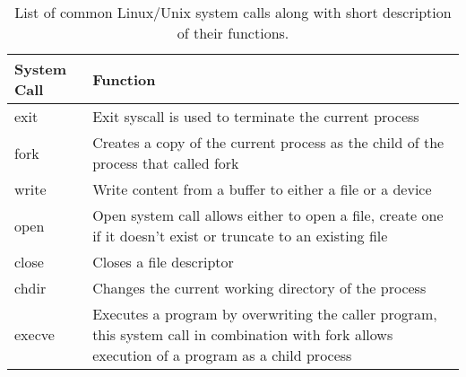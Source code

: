 \documentclass[a4,11pt]{article}
\begin{document}
\begin{table}[!h]
  \centering
  \label{table:linux-syscalls}
  \caption{List of common Linux/Unix system calls along with short
    description of their functions.}
  \vspace{0.2cm}
  \begin{tabular}{||l | p{}||} 
    \hline

    \textbf{System Call} & \textbf{Function} \\ [0.5ex] 

    \hline\hline

    exit & Exit syscall is used to terminate the current process \\
    
    \hline fork & Creates a copy of the current process as the child
    of the process that called fork \\

    \hline write & Write content from a buffer to either a file or a
    device \\

    \hline open & Open system call allows either to open a file,
    create one if it doesn't exist or truncate to an existing file
    \\

    \hline close & Closes a file descriptor \\

    \hline chdir & Changes the current working directory of the
    process \\

    \hline execve & Executes a program by overwriting the caller
    program, this system call in combination with fork allows
    execution of a program as a child process\\

    \hline
  \end{tabular}

\end{table}
\end{document}
